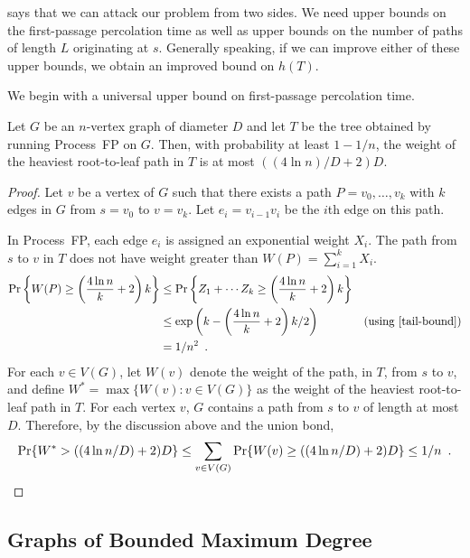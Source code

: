\documentclass[lotsofwhite]{patmorin}
\begin{document}
 says that we can attack our problem from two
sides. We need upper bounds on the first-passage percolation time as well
as upper bounds on the number of paths of length $L$ originating at $s$.
Generally speaking, if we can improve either of these upper bounds,
we obtain an improved bound on $h(T)$.

We begin with a universal upper bound on first-passage percolation time.

\begin{lem}
  Let $G$ be an $n$-vertex graph of diameter $D$ and let $T$ be the
  tree obtained by running Process~FP on $G$.  Then, with probability
  at least $1-1/n$, the weight of the heaviest root-to-leaf path in $T$
  is at most $((4\ln n)/D+2)D$.
\end{lem}

\begin{proof}
  Let $v$ be a vertex of $G$ such that there exists a path
  $P=v_0,\ldots,v_k$ with $k$ edges in $G$ from $s=v_0$ to $v=v_k$.
  Let $e_i=v_{i-1}v_i$ be the $i$th edge on this path.

  In Process~FP, each edge $e_i$ is assigned an exponential weight $X_i$.
  The path from $s$ to $v$ in $T$ does not have weight greater than
  $W(P)=\sum_{i=1}^k X_i$.
  \begin{align*}
      \Pr\left\{W(P)\ge \left(\frac{4\ln n}{k}+2\right)k\right\} 
        & \le \Pr\left\{Z_1+\cdots Z_k\ge \left(\frac{4\ln n}{k}+2\right)k\right\} \\ 
        & \le \exp\left(k - \left(\frac{4\ln n}{k}+2\right)k/2\right) 
            & \text{(using \eqref{tail-bound})} \\
      & = 1/n^2 \enspace .
  \end{align*}
  For each $v\in V(G)$, let $W(v)$ denote the weight of the path, in
  $T$, from $s$ to $v$, and define $W^*=\max\{W(v):v\in V(G)\}$  as the
  weight of the heaviest root-to-leaf path in $T$.  For each vertex $v$,
  $G$ contains a path from $s$ to $v$ of length at most $D$. Therefore,
  by the discussion above and the union bond,
  \[
      \Pr\{W^*> ((4\ln n/D)+2)D\} 
          \le \sum_{v\in V(G)}\Pr\{W(v) \ge ((4\ln n/D)+2)D\}     
       \le 1/n \enspace . \qedhere
  \]
\end{proof}

\subsection{Graphs of Bounded Maximum Degree}
\end{document}
